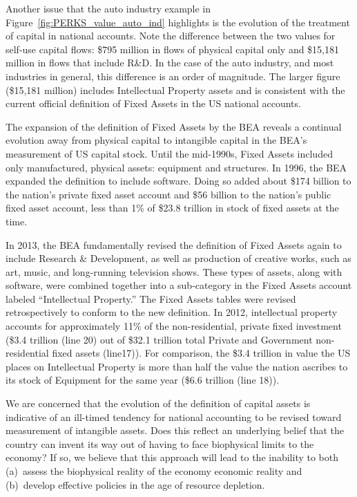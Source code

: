 Another issue that the auto industry example
in Figure~\ref{fig:PERKS_value_auto_ind} highlights is
the evolution of the treatment of capital 
in national accounts.
Note the difference between the two values for self-use
capital flows:
\$795 million in flows of physical capital only and
\$15,181 million in flows that include R\&D. 
In the case of the auto industry, and most industries
in general, this difference is an order of magnitude.  
The larger figure (\$15,181 million)
includes Intellectual Property assets and is consistent with the current 
official definition of Fixed Assets in the US national accounts.

The expansion of the definition of Fixed Assets 
by the BEA reveals a continual evolution away
from physical capital to intangible capital in
the BEA's measurement of US capital stock.
Until the mid-1990s, Fixed Assets included only manufactured, physical assets:
equipment and structures.
In 1996, the BEA expanded the definition to include software. 
Doing so added about \$174 billion to the nation's private fixed asset account and 
\$56 billion to the nation's public fixed asset account, less than
1\% of \$23.8 trillion in stock of fixed assets at the time.\cite[p. 20]{BEA2000}

In 2013, the BEA fundamentally revised the definition of Fixed Assets again 
to include Research \& Development, as well as production of 
creative works, such as art, music, and long-running television shows.
These types of assets,
along with software, were combined together into a 
sub-category in the Fixed Assets account labeled
``Intellectual Property.''\cite{BEA2013}
The Fixed Assets tables were revised retrospectively to conform to the
new definition. 
In 2012, intellectual property accounts for approximately
11\% of the non-residential, private fixed investment 
(\$3.4 trillion (line 20) out of 
\$32.1 trillion total Private and Government non-residential
fixed assets (line17)). 
For comparison, the \$3.4 trillion in
value the US places on Intellectual Property is
more than half the value the nation
ascribes to its stock of Equipment 
for the same year 
(\$6.6 trillion (line 18)).~\cite{BEA2013Table}

We are concerned that the 
evolution of the definition of capital assets 
is indicative of an ill-timed tendency for
national accounting to be revised toward 
measurement of intangible assets. 
Does this reflect an underlying belief
that the country can invent
its way out of having to face biophysical
limits to the economy? 
If so, we believe
that this approach will lead to the inability to both 
(a)~assess the biophysical reality of the economy economic reality and 
(b)~develop effective policies in the age of resource depletion.

